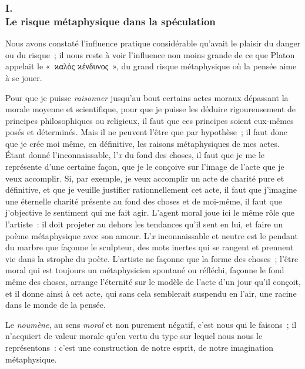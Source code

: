 \documentclass[french,twoside]{book} %
\begin{document}
\subsubsection[{I. Le risque métaphysique dans la spéculation}]{I. \\
Le risque métaphysique dans la spéculation}
\noindent Nous avons constaté l’influence pratique considérable qu’avait le plaisir du danger ou du risque ; il nous reste à voir l’influence non moins grande de ce que Platon appelait le « ϰαλός ϰένδυνος », du grand risque métaphysique où la pensée aime à se jouer.\par
Pour que je puisse \emph{raisonner} jusqu’au bout certains actes moraux dépassant la morale moyenne et scientifique, pour que je puisse les déduire rigoureusement de principes philosophiques ou religieux, il faut que ces principes soient eux-mêmes posés et déterminés. Mais il ne peuvent l’être que par hypothèse ; il faut donc que je crée moi même, en définitive, les raisons métaphysiques de mes actes. Étant donné l’inconnaissable, l’\emph{x} du fond des choses, il faut que je me le représente d’une certaine façon, que je le conçoive sur l’image de l’acte que je veux accomplir. Si, par exemple, je veux accomplir un acte de charité pure et définitive, et que je veuille justifier rationnellement cet acte, il faut que j’imagine une éternelle charité présente au fond des choses et de moi-même, il faut que j’objective le sentiment qui me fait agir. L’agent moral joue ici le même rôle que l’artiste : il doit projeter au dehors les tendances qu’il sent en lui, et faire un poème métaphysique avec son amour. L’\emph{x} inconnaissable et neutre est le pendant du marbre que façonne le sculpteur, des mots inertes qui se rangent et prennent vie dans la strophe du poète. L’artiste ne façonne que la forme des choses ; l’être moral qui est toujours un métaphysicien spontané ou réfléchi, façonne le fond même des choses, arrange l’éternité sur le modèle de l’acte d’un jour qu’il conçoit, et il donne ainsi à cet acte, qui sans cela semblerait suspendu en l’air, une racine dans le monde de la pensée.\par
Le \emph{noumène}, au sens \emph{moral} et non purement négatif, c’est nous qui le faisons ; il n’acquiert de valeur morale qu’en vertu du type sur lequel nous nous le représentons : c’est une construction de notre esprit, de notre imagination métaphysique.\par
\end{document}
